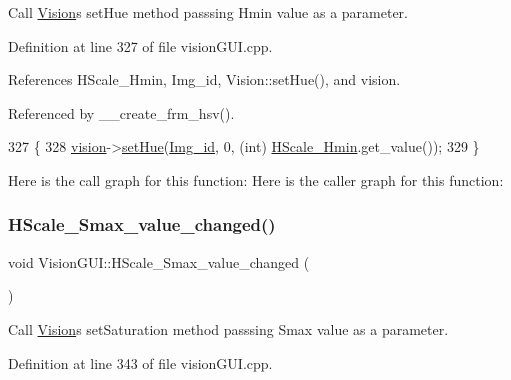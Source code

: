 Call \hyperlink{class_vision}{Vision}\textquotesingle{}s set\+Hue method passsing Hmin value as a parameter. 



Definition at line 327 of file vision\+G\+U\+I.\+cpp.



References H\+Scale\+\_\+\+Hmin, Img\+\_\+id, Vision\+::set\+Hue(), and vision.



Referenced by \+\_\+\+\_\+create\+\_\+frm\+\_\+hsv().


\begin{DoxyCode}
327                                           \{
328     \hyperlink{class_vision_g_u_i_a36aba058af844ec6cbe0c945c616cd5f}{vision}->\hyperlink{class_vision_a3c3ebea1a7c54c69f2da94b78aaf79f1}{setHue}(\hyperlink{class_vision_g_u_i_a4a46f114bc58e0f1d56b655f4bc8f9d8}{Img\_id}, 0, (\textcolor{keywordtype}{int}) \hyperlink{class_vision_g_u_i_a8cc0de8ce9ca9c05d1c47176b724ecc3}{HScale\_Hmin}.get\_value());
329 \}
\end{DoxyCode}
Here is the call graph for this function\+:
Here is the caller graph for this function\+:
\mbox{\label{class_vision_g_u_i_a37cc33977d0cfdb559bf156ffad949ad}} 
\subsubsection{\texorpdfstring{H\+Scale\+\_\+\+Smax\+\_\+value\+\_\+changed()}{HScale\_Smax\_value\_changed()}}
{\footnotesize\ttfamily void Vision\+G\+U\+I\+::\+H\+Scale\+\_\+\+Smax\+\_\+value\+\_\+changed (\begin{DoxyParamCaption}{ }\end{DoxyParamCaption})\hspace{0.3cm}{\ttfamily [private]}}



Call \hyperlink{class_vision}{Vision}\textquotesingle{}s set\+Saturation method passsing Smax value as a parameter. 



Definition at line 343 of file vision\+G\+U\+I.\+cpp.



